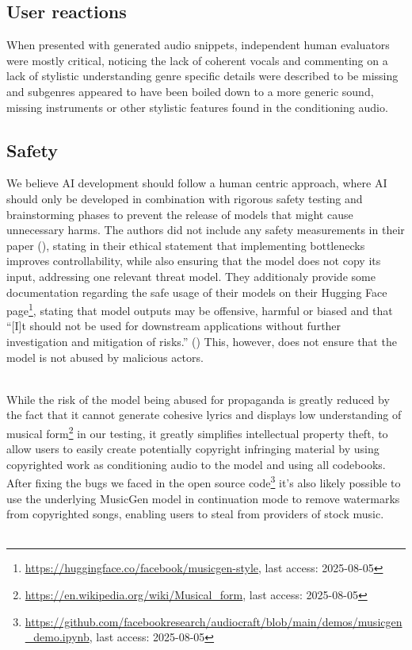 \documentclass[a4paper,12pt,twoside]{article}
\begin{document}
\subsection{User reactions}
When presented with generated audio snippets, independent human evaluators were mostly critical, noticing the lack of coherent vocals and commenting on a lack of stylistic understanding genre specific details were described to be missing and subgenres appeared to have been boiled down to a more generic sound, missing instruments or other stylistic features found in the conditioning audio.

\subsection{Safety}
We believe AI development should follow a human centric approach, where AI should only be developed in combination with rigorous safety testing and brainstorming phases to prevent the release of models that might cause unnecessary harms. The authors did not include any safety measurements in their paper (\cite{rouardAudioConditioningMusic2024}), stating in their ethical statement that implementing bottlenecks improves controllability, while also ensuring that the model does not copy its input, addressing one relevant threat model. They additionaly provide some documentation regarding the safe usage of their models on their Hugging Face page\footnote{\url{https://huggingface.co/facebook/musicgen-style}, last access: 2025-08-05}, stating that model outputs may be offensive, harmful or biased and that ``[I]t should not be used for downstream applications without further investigation and mitigation of risks.'' (\cite{rouardAudioConditioningMusic2024}) This, however, does not ensure that the model is not abused by malicious actors.\\ \

While the risk of the model being abused for propaganda is greatly reduced by the fact that it cannot generate cohesive lyrics and displays low understanding of musical form\footnote{\url{https://en.wikipedia.org/wiki/Musical_form}, last access: 2025-08-05} in our testing, it greatly simplifies intellectual property theft, to allow users to easily create potentially copyright infringing material by using copyrighted work as conditioning audio to the model and using all codebooks. After fixing the bugs we faced in the open source code\footnote{\url{https://github.com/facebookresearch/audiocraft/blob/main/demos/musicgen_demo.ipynb}, last access: 2025-08-05} it's also likely possible to use the underlying MusicGen model in continuation mode to remove watermarks from copyrighted songs, enabling users to steal from providers of stock music.\\ \
\end{document}
